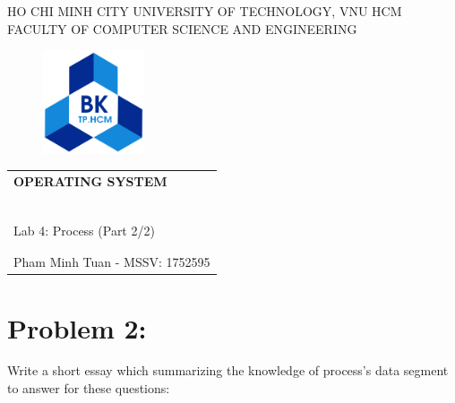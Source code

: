 \documentclass[a4paper]{article}
\begin{document}
    \begin{titlepage}
        \begin{center}
            HO CHI MINH CITY UNIVERSITY OF TECHNOLOGY, VNU HCM \\
            FACULTY OF COMPUTER SCIENCE AND ENGINEERING
        \end{center}

        \vspace{1cm}

        \begin{figure}[h!]
            \begin{center}
                \includegraphics[width=3cm]{hcmut.png}
            \end{center}
        \end{figure}

        \vspace{1cm}

        \begin{center}
            \begin{tabular}{c}
                \multicolumn{1}{l}{\textbf{\LARGE OPERATING SYSTEM}} \\
                ~~\\
                \hline
                \\
                \multicolumn{1}{l}{\LARGE Lab 4: Process (Part 2/2)} \\
                \\
                \hline
                \\
                \hspace{5cm} Pham Minh Tuan - MSSV: 1752595
            \end{tabular}
        \end{center}
    \end{titlepage}

\newpage

\section{Problem 2:} Write a short essay which summarizing the knowledge of process’s data segment to answer for these questions:
\end{document}
